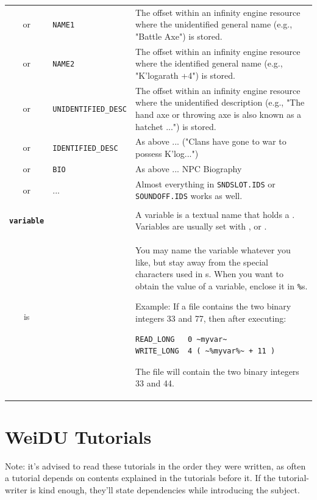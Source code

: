 \documentclass{article}
\def\ttref#1{\ahrefloc{#1}{\tt #1}}
\def\DEFINE#1{{\tt \bf #1}\label{#1}\index{#1}}
\def\t#1{{\tt #1}}
\begin{document}
\begin{tabular}{cp{10in}|p{10in}}
or & \t{NAME1}   & The offset within an infinity engine resource where the unidentified general name (e.g., "Battle Axe") is stored. \\
or & \t{NAME2}   & The offset within an infinity engine resource where the identified general name (e.g., "K'logarath +4") is stored. \\
or & \t{UNIDENTIFIED_DESC}  & The offset within an infinity engine resource where the unidentified description (e.g., "The hand axe or throwing axe is also known as a hatchet ...") is stored. \\
or & \t{IDENTIFIED_DESC}    & As above ... ("Clans have gone to war to possess K'log...")\\
or & \t{BIO}                & As above ... NPC Biography\\
or & ...        & Almost everything in \t{SNDSLOT.IDS} or \t{SOUNDOFF.IDS}
works as well. \\

\\

\DEFINE{variable} & & A variable is a textual name that holds a
\ttref{value}. Variables are usually set with \ttref{READ_BYTE},
\ttref{SET} or \ttref{SPRINT}. \\
is & \ttref{String} & You may name the variable whatever you like, but stay
away from the special characters used in \ttref{regexp}s. When you want to
obtain the value of a variable, enclose it in \t{\%}s.


Example: If a file contains the two binary integers 33 and 77, then after
executing:

\begin{verbatim}
READ_LONG   0 ~myvar~
WRITE_LONG  4 ( ~%myvar%~ + 11 )
\end{verbatim}

The file will contain the two binary integers 33 and 44. \\

\end{tabular}

\section{WeiDU \ttref{TP2} Tutorials}
\label{TP Tutorials}

Note: it's advised to read these tutorials in the order they were written,
as often a tutorial depends on contents explained in the tutorials before
it. If the tutorial-writer is kind enough, they'll state dependencies while
introducing the subject.
\end{document}
